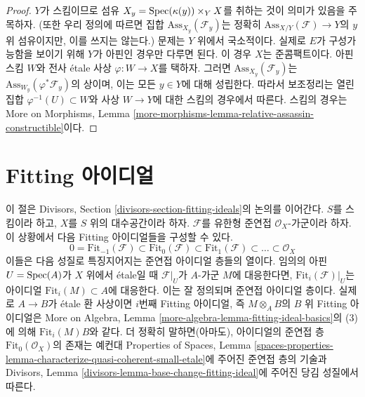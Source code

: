 \begin{proof}
$Y$가 스킴이므로 섬유
$X_y = \mathop{\mathrm{Spec}}(\kappa(y)) \times_Y X$를 취하는 것이 의미가 있음을 주목하자.
(또한 우리 정의에 따르면 집합 $\text{Ass}_{X_y}(\mathcal{F}_y)$는 정확히
$\text{Ass}_{X/Y}(\mathcal{F}) \to Y$의 $y$ 위 섬유이지만, 이를 쓰지는
않는다.) 문제는 $Y$ 위에서 국소적이다. 실제로 $E$가 구성가능함을 보이기
위해 $Y$가 아핀인 경우만 다루면 된다. 이 경우 $X$는 준콤팩트이다. 아핀
스킴 $W$와 전사 \'etale 사상 $\varphi : W \to X$를 택하자. 그러면
$\text{Ass}_{X_y}(\mathcal{F}_y)$는
$\text{Ass}_{W_y}(\varphi^*\mathcal{F}_y)$의 상이며, 이는 모든 $y \in Y$에
대해 성립한다. 따라서 보조정리는
열린집합 $\varphi^{-1}(U) \subset W$와 사상 $W \to Y$에 대한 스킴의
경우에서 따른다. 스킴의 경우는 More on Morphisms, Lemma
\ref{more-morphisms-lemma-relative-assassin-constructible}이다.
\end{proof}









\section{Fitting 아이디얼}
\label{section-fitting-ideals}

\noindent
이 절은 Divisors, Section
\ref{divisors-section-fitting-ideals}의 논의를 이어간다.
$S$를 스킴이라 하고, $X$를 $S$ 위의 대수공간이라 하자.
$\mathcal{F}$를 유한형 준연접 $\mathcal{O}_X$-가군이라 하자.
이 상황에서 다음 Fitting 아이디얼들을 구성할 수 있다.
$$
0 = \text{Fit}_{-1}(\mathcal{F}) \subset \text{Fit}_0(\mathcal{F}) \subset
\text{Fit}_1(\mathcal{F}) \subset \ldots \subset \mathcal{O}_X
$$
이들은 다음 성질로 특징지어지는 준연접 아이디얼 층들의 열이다. 임의의
아핀 $U = \mathop{\mathrm{Spec}}(A)$가 $X$ 위에서 \'etale일 때 $\mathcal{F}|_U$가
$A$-가군 $M$에 대응한다면, $\text{Fit}_i(\mathcal{F})|_U$는
아이디얼 $\text{Fit}_i(M) \subset A$에 대응한다. 이는 잘 정의되며 준연접
아이디얼 층이다. 실제로 $A \to B$가 \'etale 환 사상이면 $i$번째 Fitting
아이디얼, 즉 $M \otimes_A B$의 $B$ 위 Fitting 아이디얼은 More on Algebra, Lemma
\ref{more-algebra-lemma-fitting-ideal-basics}의 (3)에 의해
$\text{Fit}_i(M) B$와 같다.
더 정확히 말하면(아마도), 아이디얼의 준연접 층
$\text{Fit}_0(\mathcal{O}_X)$의 존재는 예컨대 Properties of Spaces, Lemma
\ref{spaces-properties-lemma-characterize-quasi-coherent-small-etale}에 주어진
준연접 층의 기술과 Divisors, Lemma
\ref{divisors-lemma-base-change-fitting-ideal}에 주어진 당김 성질에서 따른다.

